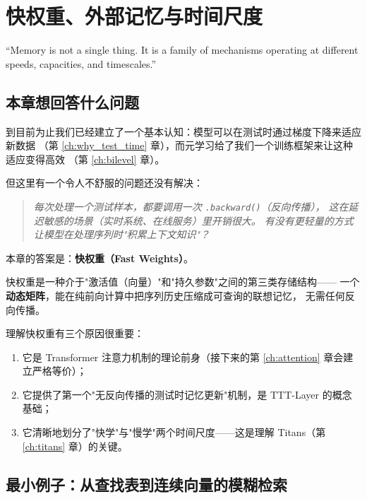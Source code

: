 \chapter{快权重、外部记忆与时间尺度}
\label{ch:fastweights}

\epigraph{``Memory is not a single thing. It is a family of mechanisms operating at different
speeds, capacities, and timescales.''}{}

\section{本章想回答什么问题}

到目前为止我们已经建立了一个基本认知：模型可以在测试时通过梯度下降来适应新数据
（第 \ref{ch:why_test_time} 章），而元学习给了我们一个训练框架来让这种适应变得高效
（第 \ref{ch:bilevel} 章）。

但这里有一个令人不舒服的问题还没有解决：

\begin{quote}
\textit{每次处理一个测试样本，都要调用一次 \texttt{.backward()}（反向传播），
这在延迟敏感的场景（实时系统、在线服务）里开销很大。
有没有更轻量的方式让模型在处理序列时"积累上下文知识"？}
\end{quote}

本章的答案是：\textbf{快权重（Fast Weights）}。

快权重是一种介于"激活值（向量）"和"持久参数"之间的第三类存储结构——
一个\textbf{动态矩阵}，能在纯前向计算中把序列历史压缩成可查询的联想记忆，
无需任何反向传播。

理解快权重有三个原因很重要：
\begin{enumerate}
  \item 它是 Transformer 注意力机制的理论前身（接下来的第 \ref{ch:attention} 章会建立严格等价）；
  \item 它提供了第一个"无反向传播的测试时记忆更新"机制，是 TTT-Layer 的概念基础；
  \item 它清晰地划分了"快学"与"慢学"两个时间尺度——这是理解 Titans（第 \ref{ch:titans} 章）的关键。
\end{enumerate}

\section{最小例子：从查找表到连续向量的模糊检索}
\label{sec:fastweights_minimal}

